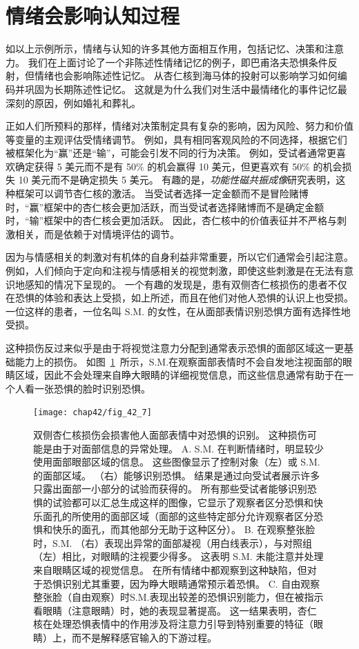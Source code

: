 \section{情绪会影响认知过程}

如以上示例所示，情绪与认知的许多其他方面相互作用，包括记忆、决策和注意力。
我们在上面讨论了一个非陈述性情绪记忆的例子，即巴甫洛夫恐惧条件反射，但情绪也会影响陈述性记忆。
从杏仁核到海马体的投射可以影响学习如何编码并巩固为长期陈述性记忆。
这就是为什么我们对生活中最情绪化的事件记忆最深刻的原因，例如婚礼和葬礼。


正如人们所预料的那样，情绪对决策制定具有复杂的影响，因为风险、努力和价值等变量的主观评估受情绪调节。
例如，具有相同客观风险的不同选择，根据它们被框架化为“赢”还是“输”，可能会引发不同的行为决策。
例如，受试者通常更喜欢确定获得 5 美元而不是有 50\% 的机会赢得 10 美元，但更喜欢有 50\% 的机会损失 10 美元而不是确定损失 5 美元。
有趣的是，\textit{功能性磁共振成像}研究表明，这种框架可以调节杏仁核的激活。
当受试者选择一定金额而不是冒险赌博时，“赢”框架中的杏仁核会更加活跃，而当受试者选择赌博而不是确定金额时，“输”框架中的杏仁核会更加活跃。
因此，杏仁核中的价值表征并不严格与刺激相关，而是依赖于对情境评估的调节。


因为与情感相关的刺激对有机体的自身利益非常重要，所以它们通常会引起注意。
例如，人们倾向于定向和注视与情感相关的视觉刺激，即使这些刺激是在无法有意识地感知的情况下呈现的。
一个有趣的发现是，患有双侧杏仁核损伤的患者不仅在恐惧的体验和表达上受损，如上所述，而且在他们对他人恐惧的认识上也受损。
一位这样的患者，一位名叫 S.M. 的女性，在从面部表情识别恐惧方面有选择性地受损。

这种损伤反过来似乎是由于将视觉注意力分配到通常表示恐惧的面部区域这一更基础能力上的损伤。
如图~\ref{fig:42_7}~所示，S.M.在观察面部表情时不会自发地注视面部的眼睛区域，因此不会处理来自睁大眼睛的详细视觉信息，而这些信息通常有助于在一个人看一张恐惧的脸时识别恐惧。




\begin{figure}[htbp]
	\centering
	\texttt{[image: chap42/fig\_42\_7]}
	\caption{双侧杏仁核损伤会损害他人面部表情中对恐惧的识别。
		这种损伤可能是由于对面部信息的异常处理。
		A. S.M. 在判断情绪时，明显较少使用面部眼部区域的信息。
		这些图像显示了控制对象（左）或 S.M. 的面部区域。
		（右）能够识别恐惧。
		结果是通过向受试者展示许多只露出面部一小部分的试验而获得的。
		所有那些受试者能够识别恐惧的试验都可以汇总生成这样的图像，它显示了观察者区分恐惧和快乐面孔的所使用的面部区域（面部的这些特定部分允许观察者区分恐惧和快乐的面孔，而其他部分无助于这种区分）。
		B. 在观察整张脸时，S.M. （右）表现出异常的面部凝视（用白线表示），与对照组（左）相比，对眼睛的注视要少得多。
		这表明 S.M. 未能注意并处理来自眼睛区域的视觉信息。
		在所有情绪中都观察到这种缺陷，但对于恐惧识别尤其重要，因为睁大眼睛通常预示着恐惧。
		C. 自由观察整张脸（自由观察）时S.M.表现出较差的恐惧识别能力，但在被指示看眼睛（注意眼睛）时，她的表现显著提高。
		这一结果表明，杏仁核在处理恐惧表情中的作用涉及将注意力引导到特别重要的特征（眼睛）上，而不是解释感官输入的下游过程。}
	\label{fig:42_7}
\end{figure}


